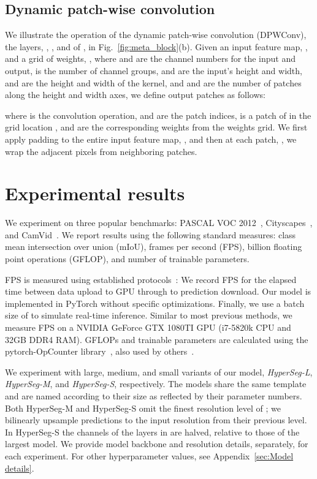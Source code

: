 \documentclass[final]{cvpr}
\begin{document}
\subsection{Dynamic patch-wise convolution}
\label{subsec:Dynamic patch-wise convolution}
We illustrate the operation of the dynamic patch-wise convolution (DPWConv), the layers, , , and  of , in Fig.~\ref{fig:meta_block}(b). Given an input feature map, , and a grid of weights, 
, where  and  are the channel numbers for the input and output,  is the number of channel groups,  and  are the input's height and width,  and  are the height and width of the kernel, and  and  are the number of patches along the height and width axes, we define output patches as follows:

where  is the convolution operation,  and  are the patch indices,  is a patch of  in the grid location , and  are the corresponding weights from the weights grid. We first apply padding to the entire input feature map, , and then at each patch, , we wrap the adjacent pixels from neighboring patches.


\section{Experimental results}
\label{sec:Experimental results}
We experiment on three popular benchmarks: PASCAL VOC 2012~\cite{everingham2010pascal}, Cityscapes~\cite{cordts2016cityscapes}, and CamVid~\cite{brostow2009semantic}. We report results using the following standard measures: class mean intersection over union (mIoU), frames per second (FPS), billion floating point operations (GFLOP), and number of trainable parameters. 

FPS is measured using established protocols~\cite{orsic2019defense}: We record FPS for the elapsed time between data upload to GPU through to prediction download. Our model is implemented in PyTorch without specific optimizations. Finally, we use a batch size of  to simulate real-time inference. 
Similar to most previous methods, we measure FPS on a NVIDIA GeForce GTX 1080TI GPU (i7-5820k CPU and 32GB DDR4 RAM). GFLOPs and trainable parameters are calculated using the pytorch-OpCounter library~\cite{pytorchOpCounter}, also used by others~\cite{orsic2019defense}.

We experiment with large, medium, and small variants of our model, {\em HyperSeg-L}, {\em HyperSeg-M}, and {\em HyperSeg-S}, respectively. The models share the same template and are named according to their size as reflected by their parameter numbers. Both HyperSeg-M and HyperSeg-S omit the finest resolution level of ; we bilinearly upsample predictions to the input resolution from their previous level. In HyperSeg-S the channels of the layers in  are halved, relative to those of the largest model. We provide model backbone and resolution details, separately, for each experiment. For other hyperparameter values, see Appendix~\ref{sec:Model details}.
\end{document}

